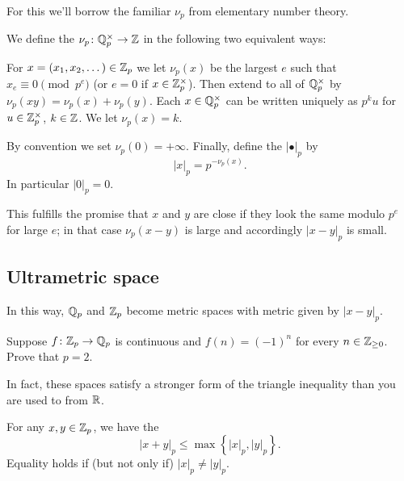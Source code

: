 For this we'll borrow the familiar $\nu_p$ from elementary number theory.
\begin{definition}
	We define the  $\nu_p \colon \mathbb Q_p^\times \to \mathbb Z$
	in the following two equivalent ways:
	\begin{itemize}
		\ii For $x = (x_1, x_2, \dots) \in \mathbb Z_p$ we let
		$\nu_p(x)$ be the largest $e$ such that
		$x_e \equiv 0 \pmod{p^e}$ (or $e=0$ if $x \in \mathbb Z_p^\times$).
		Then extend to all of $\mathbb Q_p^\times$
		by $\nu_p(xy) = \nu_p(x) + \nu_p(y)$.
		\ii Each $x \in \mathbb Q_p^\times$ can be written
		uniquely as $p^k u$ for $u \in \mathbb Z_p^\times$, $k \in \mathbb Z$.
		We let $\nu_p(x) = k$.
	\end{itemize}
	By convention we set $\nu_p(0) = +\infty$.
	Finally, define the 
	$\left\lvert \bullet \right\rvert_p$ by
	\[ \left\lvert x \right\rvert_p = p^{-\nu_p(x)}. \]
	In particular $\left\lvert 0 \right\rvert_p = 0$.
\end{definition}
This fulfills the promise that $x$ and $y$ are close
if they look the same modulo $p^e$ for large $e$;
in that case $\nu_p(x-y)$ is large
and accordingly $\left\lvert x-y \right\rvert_p$ is small.

\subsection{Ultrametric space}
In this way, $\mathbb Q_p$ and $\mathbb Z_p$ become metric spaces
with metric given by $\left\lvert x-y \right\rvert_p$.

\begin{exercise}
	\label{exer:alternating}
	Suppose $f \colon \mathbb Z_p \to \mathbb Q_p$ is continuous
	and $f(n) = (-1)^n$ for every $n \in \mathbb Z_{\ge 0}$.
	Prove that $p = 2$.
\end{exercise}

In fact, these spaces satisfy a stronger
form of the triangle inequality than you are used to from $\mathbb R$.
\begin{proposition}
	For any $x,y \in \mathbb Z_p$, we have the 
	\[ \left\lvert x+y \right\rvert_p
		\le \max \left\{ \left\lvert x \right\rvert_p,
		\left\lvert y \right\rvert_p \right\}.
	\]
	Equality holds if (but not only if)
	$\left\lvert x \right\rvert_p \neq \left\lvert y \right\rvert_p$.
\end{proposition}

